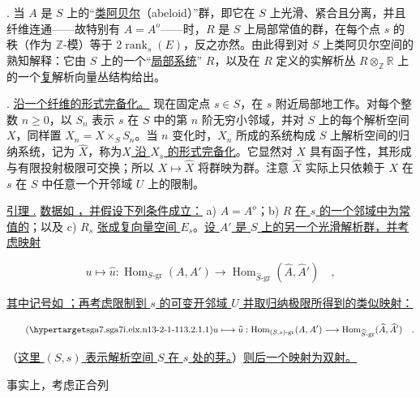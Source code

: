 \medskip
\noindent
{}. 当 $A$ 是 $S$ 上的“\underline{类阿贝尔}（abeloid）”群，即它在 $S$ 上光滑、紧合且分离，并且纤维连通——故特别有 $A=A^o$——时，$R$ 是 $S$ 上局部常值的群，在每个点 $s$ 的秩（作为 $\mathbb Z$-模）等于 $2\operatorname{rank}_s(E)$，反之亦然。由此得到对 $S$ 上类阿贝尔空间的熟知解释：它由 $S$ 上的一个“\underline{局部系统}” $R$，以及在 $R$ 定义的实解析丛 $R\otimes_{\mathbb Z}\mathbb R$ 上的一个\underline{复}解析向量丛结构给出。

\medskip
\noindent
{}. \underline{沿一个纤维的形式完备化。} 现在固定点 $s\in S$，在 $s$ 附近局部地工作。对每个整数 $n\geqslant0$，以 $S_n$ 表示 $s$ 在 $S$ 中的第 $n$ 阶无穷小邻域，并对 $S$ 上的每个解析空间 $X$，同样置 $X_n=X\times_S S_n$。当 $n$ 变化时，$X_n$ 所成的系统构成 $S$ 上解析空间的归纳系统，记为 $\widehat X$，称为\underline{$X$ 沿 $X_s$ 的形式完备化}。它显然对 $X$ 具有函子性，其形成与有限投射极限可交换；所以 $X\longmapsto\widehat X$ 将群映为群。注意 $\widehat X$ 实际上只依赖于 $X$ 在 $s$ 在 $S$ 中任意一个开邻域 $U$ 上的限制。

\medskip
\noindent
\underline{引理 .} \underline{数据如 ，并假设下列条件成立：} a) $A=A^o$；b) $R$ \underline{在 $s$ 的一个邻域中为常值的}；以及 c) $R_s$ \underline{张成复向量空间 $E_s$}。\underline{设 $A'$ 是 $S$ 上的另一个光滑解析群，并考虑映射}

\begin{equation*}
 u\longmapsto\widehat u:
 \operatorname{Hom}_{S\text{-}\mathrm{gr}}(A,A')
 \longrightarrow
 \operatorname{Hom}_{\widehat S\text{-}\mathrm{gr}}
   (\widehat A,\widehat {A}')\quad ,
\end{equation*}

\noindent
\underline{其中记号如 ；再考虑限制到 $s$ 的可变开邻域 $U$ 并取归纳极限所得到的类似映射：}

\begin{equation}\tag{\SGARefTarget{sga7.sga7i.eix.n13-2-1-1}{13.2.1.1}}
 u\longmapsto\widehat u:
 \operatorname{Hom}_{(S,s)\text{-}\mathrm{gr}}(A,A')
 \longrightarrow
 \operatorname{Hom}_{\widehat S\text{-}\mathrm{gr}}
   (\widehat A,\widehat {A}')\quad .
\end{equation}

\noindent
（\underline{这里 $(S,s)$ 表示解析空间 $S$ 在 $s$ 处的芽。}）\underline{则后一个映射为双射。}

事实上，考虑正合列

